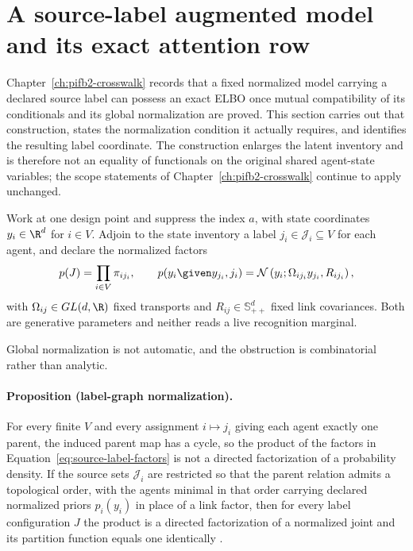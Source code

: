 \section{A source-label augmented model and its exact attention row}
\label{sec:source-label-augmented-model}

Chapter~\ref{ch:pifb2-crosswalk} records that a fixed normalized model carrying a declared source label can possess an exact ELBO once mutual compatibility of its conditionals and its global normalization are proved. This section carries out that construction, states the normalization condition it actually requires, and identifies the resulting label coordinate. The construction enlarges the latent inventory and is therefore not an equality of functionals on the original shared agent-state variables; the scope statements of Chapter~\ref{ch:pifb2-crosswalk} continue to apply unchanged.

Work at one design point and suppress the index \(a\), with state coordinates \(y_i\in\R^{d}\) for \(i\in V\). Adjoin to the state inventory a label \(j_i\in\mathcal J_i\subseteq V\) for each agent, and declare the normalized factors
\begin{equation}
p(J)=\prod_{i\in V}\pi_{ij_i},
\qquad
p(y_i\given y_{j_i},j_i)
=\mathcal N\left(y_i;\Omega_{ij_i}y_{j_i},R_{ij_i}\right),
\label{eq:source-label-factors}
\end{equation}
with \(\Omega_{ij}\in GL(d,\R)\) fixed transports and \(R_{ij}\in\mathbb S_{++}^{d}\) fixed link covariances. Both are generative parameters and neither reads a live recognition marginal.

Global normalization is not automatic, and the obstruction is combinatorial rather than analytic.

\paragraph{Proposition (label-graph normalization).}
\label{prop:label-graph-normalization}
For every finite \(V\) and every assignment \(i\mapsto j_i\) giving each agent exactly one parent, the induced parent map has a cycle, so the product of the factors in Equation~\eqref{eq:source-label-factors} is not a directed factorization of a probability density. If the source sets \(\mathcal J_i\) are restricted so that the parent relation admits a topological order, with the agents minimal in that order carrying declared normalized priors \(p_i(y_i)\) in place of a link factor, then for every label configuration \(J\) the product is a directed factorization of a normalized joint and its partition function equals one identically \citep{Lauritzen1996}.


